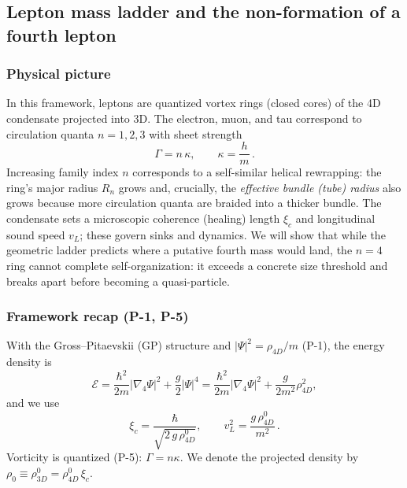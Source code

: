 \subsection{Lepton mass ladder and the non-formation of a fourth lepton}\label{sec:leptons}

\subsubsection{Physical picture}
In this framework, leptons are quantized vortex rings (closed cores) of the 4D condensate projected into 3D. The electron, muon, and tau correspond to circulation quanta \(n=1,2,3\) with sheet strength
\[
\Gamma=n\,\kappa,\qquad \kappa=\frac{h}{m}\,.
\]
Increasing family index \(n\) corresponds to a self-similar helical rewrapping: the ring’s major radius \(R_n\) grows and, crucially, the \emph{effective bundle (tube) radius} also grows because more circulation quanta are braided into a thicker bundle. The condensate sets a microscopic coherence (healing) length \(\xi_c\) and longitudinal sound speed \(v_L\); these govern sinks and dynamics. We will show that while the geometric ladder predicts where a putative fourth mass would land, the \(n{=}4\) ring cannot complete self-organization: it exceeds a concrete size threshold and breaks apart before becoming a quasi-particle.

\subsubsection{Framework recap (P-1, P-5)}
With the Gross–Pitaevskii (GP) structure and \(|\Psi|^2=\rho_{4D}/m\) (P-1), the energy density is
\[
\mathcal E=\frac{\hbar^2}{2m}|\nabla_4\Psi|^2+\frac{g}{2}|\Psi|^4
=\frac{\hbar^2}{2m}|\nabla_4\Psi|^2+\frac{g}{2m^{2}}\rho_{4D}^2,
\]
and we use
\[
\xi_c=\frac{\hbar}{\sqrt{2\,g\,\rho_{4D}^0}},\qquad
v_L^2=\frac{g\,\rho_{4D}^0}{m^{2}}\,.
\]
Vorticity is quantized (P-5): \(\Gamma=n\kappa\). We denote the projected density by \(\rho_0\equiv\rho_{3D}^0=\rho_{4D}^0\,\xi_c\).

